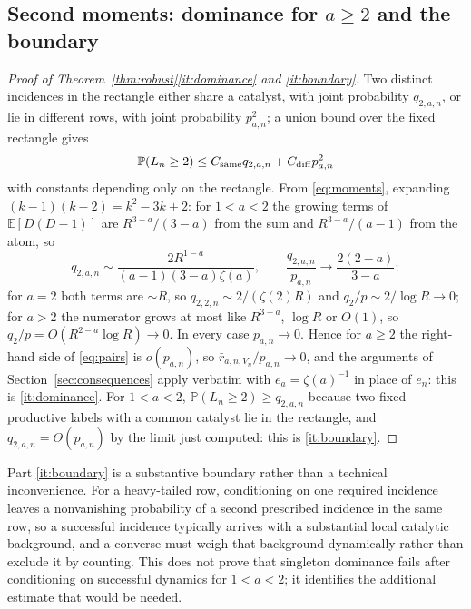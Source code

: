 \documentclass[11pt,letterpaper]{article}
\theoremstyle{plain}
\theoremstyle{definition}
\theoremstyle{remark}
\numberwithin{equation}{section}
\newcommand{\PP}{\mathbb P}
\newcommand{\EE}{\mathbb E}
\begin{document}
\subsection{Second moments: dominance for \texorpdfstring{$a\ge2$}{a >= 2} and the boundary}
\begin{proof}[Proof of Theorem~\ref{thm:robust}\ref{it:dominance} and \ref{it:boundary}]
Two distinct incidences in the rectangle either share a catalyst, with joint probability $q_{2,a,n}$, or lie in different rows, with joint probability $p_{a,n}^2$; a union bound over the fixed rectangle gives
\begin{equation}\label{eq:pairs}
 \PP(L_n\ge2)\le C_{\rm same}q_{2,a,n}+C_{\rm diff}p_{a,n}^2
\end{equation}
with constants depending only on the rectangle. From \eqref{eq:moments}, expanding $(k-1)(k-2)=k^2-3k+2$: for $1<a<2$ the growing terms of $\EE[D(D-1)]$ are $R^{3-a}/(3-a)$ from the sum and $R^{3-a}/(a-1)$ from the atom, so
\[
 q_{2,a,n}\sim\frac{2R^{1-a}}{(a-1)(3-a)\zeta(a)},\qquad\frac{q_{2,a,n}}{p_{a,n}}\to\frac{2(2-a)}{3-a};
\]
for $a=2$ both terms are $\sim R$, so $q_{2,2,n}\sim2/(\zeta(2)R)$ and $q_2/p\sim2/\log R\to0$; for $a>2$ the numerator grows at most like $R^{3-a}$, $\log R$ or $O(1)$, so $q_2/p=O(R^{2-a}\log R)\to0$. In every case $p_{a,n}\to0$. Hence for $a\ge2$ the right-hand side of \eqref{eq:pairs} is $o(p_{a,n})$, so $\bar r_{a,n,V_n}/p_{a,n}\to0$, and the arguments of Section~\ref{sec:consequences} apply verbatim with $e_a=\zeta(a)^{-1}$ in place of $e_n$: this is \ref{it:dominance}. For $1<a<2$, $\PP(L_n\ge2)\ge q_{2,a,n}$ because two fixed productive labels with a common catalyst lie in the rectangle, and $q_{2,a,n}=\Theta(p_{a,n})$ by the limit just computed: this is \ref{it:boundary}.
\end{proof}

Part \ref{it:boundary} is a substantive boundary rather than a technical inconvenience. For a heavy-tailed row, conditioning on one required incidence leaves a nonvanishing probability of a second prescribed incidence in the same row, so a successful incidence typically arrives with a substantial local catalytic background, and a converse must weigh that background dynamically rather than exclude it by counting. This does not prove that singleton dominance fails after conditioning on successful dynamics for $1<a<2$; it identifies the additional estimate that would be needed.
\end{document}
